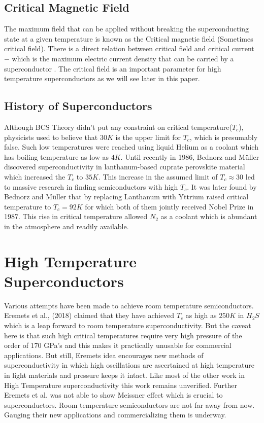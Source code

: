 \documentclass{article}
\begin{document}
	\subsection{Critical Magnetic Field}
	The maximum field that can be applied without breaking the superconducting state at a given temperature is known as the Critical magnetic field (Sometimes critical field). There is a direct relation between critical field and critical current $-$ which is the maximum electric current density that can be carried by a superconductor \cite{criticalfieldform}. The critical field is an important parameter for high temperature superconductors as we will see later in this paper.
	
	\subsection{History of Superconductors}
	Although BCS Theory didn't put any constraint on critical temperature($T_c$), physicists used to believe that $30K$ is the upper limit for $T_c$, which is presumably false. Such low temperatures were reached using liquid Helium as a coolant which has boiling temperature as low as $4 K$. Until recently in 1986,  Bednorz and Müller discovered superconductivity in lanthanum-based cuprate perovskite material which increased the $T_c$ to $35 K$. This increase in the assumed limit of $T_c \approx 30$ led to massive research in finding semiconductors with high $T_c$. It was later found by Bednorz and Müller that by replacing Lanthanum with Yttrium raised critical temperature to $T_c = 92 K$ for which both of them jointly received Nobel Prize in 1987. This rise in critical temperature allowed $N_2$ as a coolant which is abundant in the atmosphere and readily available. 
	
	
	\section{High Temperature Superconductors} Various attempts have been made to achieve room temperature semiconductors. Eremets et al., (2018) claimed that they have achieved $T_c$ as high as $250 K$ in $H_2 S$ which is a leap forward to room temperature superconductivity. But the caveat here is that such high critical temperatures require very high pressure of the order of $170$ GPa's and this makes it practically unusable for commercial applications. But still, Eremets idea encourages new methods of superconductivity in which high oscillations are ascertained at high temperature in light materials and pressure keeps it intact. Like most of the other work in High Temperature superconductivity this work remains unverified. Further Eremets et al. was not able to show Meissner effect which is crucial to superconductors. Room temperature semiconductors are not far away from now. Gauging their new applications and commercializing them is underway.  
	
\end{document}
